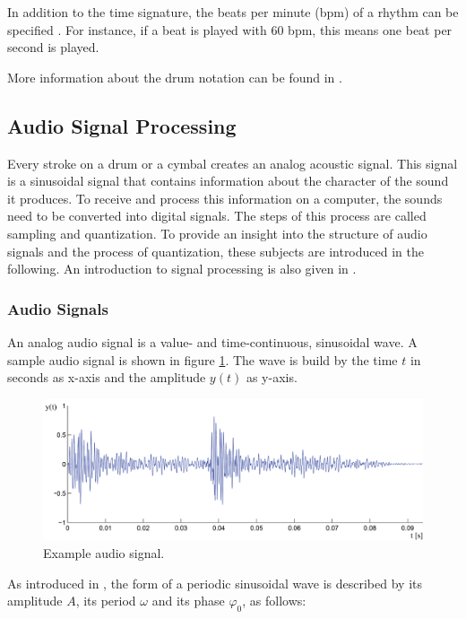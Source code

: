 In addition to the time signature, the beats per minute (bpm) of a rhythm can be specified . For instance, if a beat is played with 60 bpm, this means one beat per second is played.

More information about the drum notation can be found in \autocite{Stein:2013}.

\subsection{Audio Signal Processing}

Every stroke on a drum or a cymbal creates an analog acoustic signal. This signal is a sinusoidal signal that contains information about the character of the sound it produces. To receive and process this information on a computer, the sounds need to be converted into digital signals. The steps of this process are called sampling and quantization. To provide an insight into the structure of audio signals and the process of quantization, these subjects are introduced in the following. An introduction to signal processing is also given in \autocite{Werner:2012}.

\subsubsection{Audio Signals}

An analog audio signal is a value- and time-continuous, sinusoidal wave. A sample audio signal is shown in figure \ref{fig:audiosignal}. The wave is build by the time $t$ in seconds as x-axis and the amplitude $y(t)$ as y-axis.

\begin{figure}[h]
	\centering
	\includegraphics[width=.9\textwidth]{images/audiosignal.png}
	\caption{Example audio signal.}
	\label{fig:audiosignal}
\end{figure}

As introduced in \autocite{Weltner:2013}, the form of a periodic sinusoidal wave is described by its amplitude $A$, its period $\omega$ and its phase $\varphi_0$, as follows:
 
